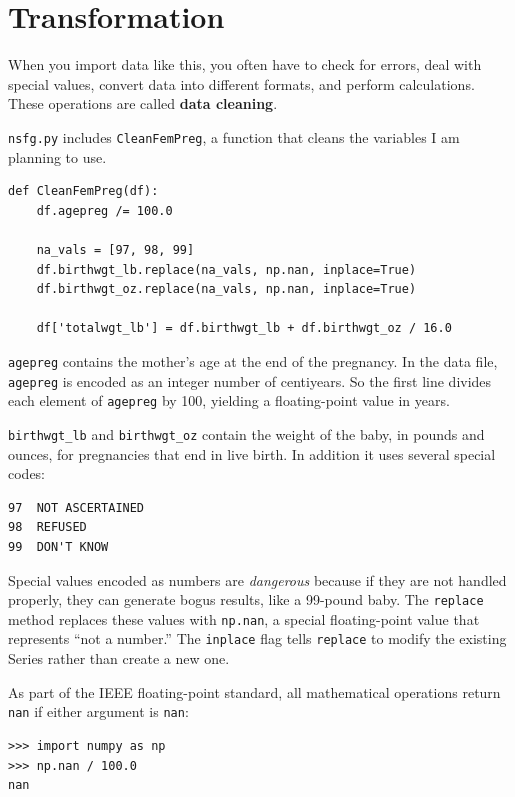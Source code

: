 \documentclass[12pt]{book}
\begin{document}
\section{Transformation}
\label{cleaning}

When you import data like this, you often have to check for errors,
deal with special values, convert data into different formats, and
perform calculations.  These operations are called {\bf data cleaning}.

{\tt nsfg.py} includes {\tt CleanFemPreg}, a function that cleans
the variables I am planning to use.

\begin{verbatim}
def CleanFemPreg(df):
    df.agepreg /= 100.0

    na_vals = [97, 98, 99]
    df.birthwgt_lb.replace(na_vals, np.nan, inplace=True)
    df.birthwgt_oz.replace(na_vals, np.nan, inplace=True)

    df['totalwgt_lb'] = df.birthwgt_lb + df.birthwgt_oz / 16.0    
\end{verbatim}

{\tt agepreg} contains the mother's age at the end of the
pregnancy.  In the data file, {\tt agepreg} is encoded as an integer
number of centiyears.  So the first line divides each element
of {\tt agepreg} by 100, yielding a floating-point value in
years.

\verb"birthwgt_lb" and \verb"birthwgt_oz" contain the weight of the
baby, in pounds and ounces, for pregnancies that end in live birth.
In addition it uses several special codes:

\begin{verbatim}
97	NOT ASCERTAINED
98	REFUSED	 
99	DON'T KNOW
\end{verbatim}

Special values encoded as numbers are {\em dangerous} because if they
are not handled properly, they can generate bogus results, like
a 99-pound baby.  The {\tt replace} method replaces these values with
{\tt np.nan}, a special floating-point value that represents ``not a
number.''  The {\tt inplace} flag tells {\tt replace} to modify the
existing Series rather than create a new one.

As part of the IEEE floating-point standard, all mathematical
operations return {\tt nan} if either argument is {\tt nan}:

\begin{verbatim}
>>> import numpy as np
>>> np.nan / 100.0
nan
\end{verbatim}
\end{document}
